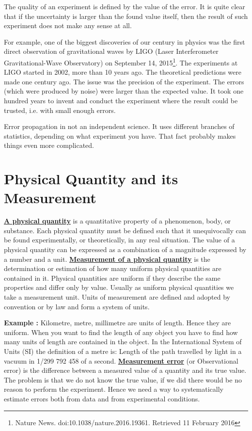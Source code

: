 \documentclass[12pt,a4paper]{article}
\newcommand{\definition}[1]{ \textcolor{MyRed}{\uline{\textbf {#1}}}}%
\newcommand{\example}[1]{\textcolor{MyBlue}{\textbf{Example {#1}: }}}
\begin{document}
The quality of an experiment is defined by the value of the error. It is quite clear that if the uncertainty is larger than the found value itself, then the result of such experiment does not make any sense at all.

For example, one of the biggest discoveries of our century in physics was the first direct observation of gravitational waves by LIGO (Laser Interferometer Gravitational-Wave Observatory) on September 14, 2015\footnote{Nature News. doi:10.1038/nature.2016.19361. Retrieved 11 February 2016}. The experiments at LIGO started in 2002, more than 10 years ago. The theoretical predictions were made one century ago. The issue was the precision of the experiment. The errors (which were produced by noise) were larger than the expected value. It took one hundred years to invent and conduct the experiment where the result could be trusted, i.e. with small enough errors.

Error propagation in not an independent science. It uses different branches of statistics, depending on what experiment you have. That fact probably makes things even more complicated.

\section{Physical Quantity and its Measurement}

\definition{A physical quantity} is a quantitative property of a phenomenon, body, or substance.
Each physical quantity must be defined such that it unequivocally can be found experimentally, or theoretically, in any real situation. The value of a physical quantity can be expressed as a combination of a magnitude expressed by a number and a unit.
 \newline
\newline
\definition{Measurement of a physical quantity} is the determination or estimation of how many uniform physical quantities are contained in it. Physical quantities are uniform if they describe the same properties and differ only by value. Usually as uniform physical quantities we take a measurement unit. Units of measurement are defined and adopted by convention or by law and form a system of units.

\example{} Kilometre, metre, millimetre are units of length. Hence they are uniform. When you want to find the length of any object you have to find how many units of length are contained in the object. In the International System of Units (SI) the definition of a metre is: Length of the path travelled by light in a vacuum in 1/299 792 458 of a second.
\newline
\newline
\definition{Measurement error} (or Observational error) is the difference between a measured value of a quantity and its true value. The problem is that we do not know the true value, if we did there would be no reason to perform the experiment. Hence we need a way to systematically estimate errors both from data and from experimental conditions.
\end{document}
